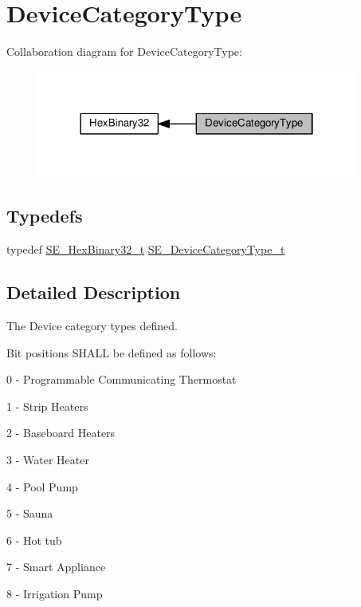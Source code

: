 \hypertarget{group__DeviceCategoryType}{}\section{Device\+Category\+Type}
\label{group__DeviceCategoryType}
Collaboration diagram for Device\+Category\+Type\+:\nopagebreak
\begin{figure}[H]
\begin{center}
\leavevmode
\includegraphics[width=298pt]{group__DeviceCategoryType}
\end{center}
\end{figure}
\subsection*{Typedefs}
\begin{DoxyCompactItemize}
\item 
typedef \hyperlink{group__HexBinary32_ga062e99a233c4875284116657d048bb98}{S\+E\+\_\+\+Hex\+Binary32\+\_\+t} \hyperlink{group__DeviceCategoryType_gafc136ae19a3dd5b2fd2265d848ddeb2f}{S\+E\+\_\+\+Device\+Category\+Type\+\_\+t}
\end{DoxyCompactItemize}


\subsection{Detailed Description}
The Device category types defined.

Bit positions S\+H\+A\+LL be defined as follows\+:

0 -\/ Programmable Communicating Thermostat

1 -\/ Strip Heaters

2 -\/ Baseboard Heaters

3 -\/ Water Heater

4 -\/ Pool Pump

5 -\/ Sauna

6 -\/ Hot tub

7 -\/ Smart Appliance

8 -\/ Irrigation Pump

